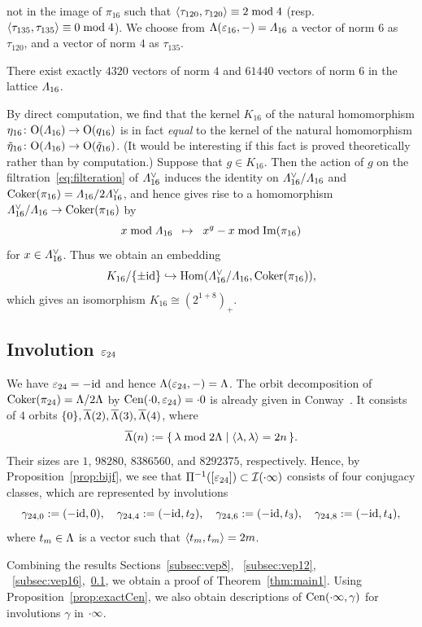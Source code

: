 \documentclass{amsart} %
\begin{document}
not in the image of $\pi_{16}$ 
such that
$\langle  \tau_{120}, \tau_{120} \rangle\equiv 2 \bmod 4$
 (resp. ~$\langle  \tau_{135}, \tau_{135} \rangle\equiv 0 \bmod 4$).
 We choose from $\Lambda(\varepsilon_{16}, -)=\varLambda_{16}$ a vector of norm $6$ as $\tau_{120}$,
 and a vector of norm $4$ as $\tau_{135}$.
%
\begin{remark}\label{remLam16}
There exist exactly $4320$ vectors of norm $4$ 
and $61440$ vectors of norm $6$ 
in the lattice $\varLambda_{16}$.
\end{remark}
%
\begin{remark}\label{remK16}
By direct computation, 
we find that 
the kernel $K_{16}$ of the natural homomorphism $\eta_{16}\colon\mathord{\mathrm{O}}(\varLambda_{16})\to \mathord{\mathrm{O}}(q_{16})$
is in fact \emph{equal} to the kernel of the natural homomorphism 
$\tilde{\eta}_{16}\colon \mathord{\mathrm{O}}(\varLambda_{16})\to \mathord{\mathrm{O}}(\tilde{q}_{16})$.
(It would be interesting if this fact is proved theoretically rather than by computation.)
Suppose that $g\in K_{16}$.
Then 
the action of $g$ on
the filtration~\eqref{eq:filteration} of $\varLambda_{16}^{\vee}$
induces the identity on 
 $\varLambda_{16}^{\vee}/\varLambda_{16}$ and $\operatorname{Coker} (\pi_{16})=\varLambda_{16}/2\varLambda_{16}^{\vee}$, 
and hence gives rise to a homomorphism $\varLambda_{16}^{\vee}/\varLambda_{16}\to \operatorname{Coker} (\pi_{16})$
by 
\[ x \bmod \varLambda_{16} \;\;\mapsto \;\; x^g- x \bmod \operatorname{Im}(\pi_{16})
\]
for $x\in \varLambda_{16}^{\vee}$.
Thus we obtain an embedding
\[
K_{16}/\{\pm \mathord{\mathrm{id}}\}\hookrightarrow \operatorname{Hom}(\varLambda_{16}^{\vee}/\varLambda_{16}, \operatorname{Coker} (\pi_{16})), 
\]
which gives an isomorphism $K_{16}\cong (2^{1+8})_{+}$.
\end{remark}
%
%
\subsection{Involution $\varepsilon_{24}$}\label{subsec:vep24}
%
We have $\varepsilon_{24}=-\mathord{\mathrm{id}}$ and hence $\Lambda(\varepsilon_{24}, -)=\Lambda$.
The orbit decomposition of 
$\operatorname{Coker}(\pi_{24})=\Lambda/2\Lambda$ by $\mathrm{Cen}(\cdot 0, \varepsilon_{24})=\cdot 0$ is already given in 
Conway~\cite[Chapter 10, Section 3.3]{theCSbook}.
It consists of $4$ orbits $\{0\}, \overline{\Lambda}(2), \overline{\Lambda}(3), \overline{\Lambda}(4)$, where 
\[
 \overline{\Lambda}(n):=\{\,{\lambda\bmod 2\Lambda}\mid {\langle \lambda, \lambda \rangle=2n} \,\}.
\]
Their sizes are $1$, $98280$, $8386560$, and $8292375$, respectively.
Hence, by Proposition~\ref{prop:bijf}, we see that 
$\Pi^{-1} ([\varepsilon_{24}])\subset \mathord{\mathcal{I}}(\cdot \infty)$ consists of four conjugacy classes,
 which are 
 represented by involutions
 \[
\gamma_{24, 0}:=(-\mathord{\mathrm{id}}, 0),
\quad
\gamma_{24, 4}:=(-\mathord{\mathrm{id}}, t_2),
\quad
\gamma_{24, 6}:=(-\mathord{\mathrm{id}}, t_3),
\quad
\gamma_{24, 8}:=(-\mathord{\mathrm{id}}, t_4),
 \]
where $t_m\in \Lambda$ is a vector such that
$\langle  t_m, t_m \rangle=2m$.
%
\par
\medskip
Combining the results Sections~\ref{subsec:vep8}, ~\ref{subsec:vep12}, ~\ref{subsec:vep16},~\ref{subsec:vep24},
we obtain a proof of Theorem~\ref{thm:main1}.
Using Proposition~\ref{prop:exactCen}, we also obtain descriptions of $\mathrm{Cen}(\cdot \infty, \gamma)$
for involutions $\gamma$ in $\cdot \infty$.
%
%
\end{document}
